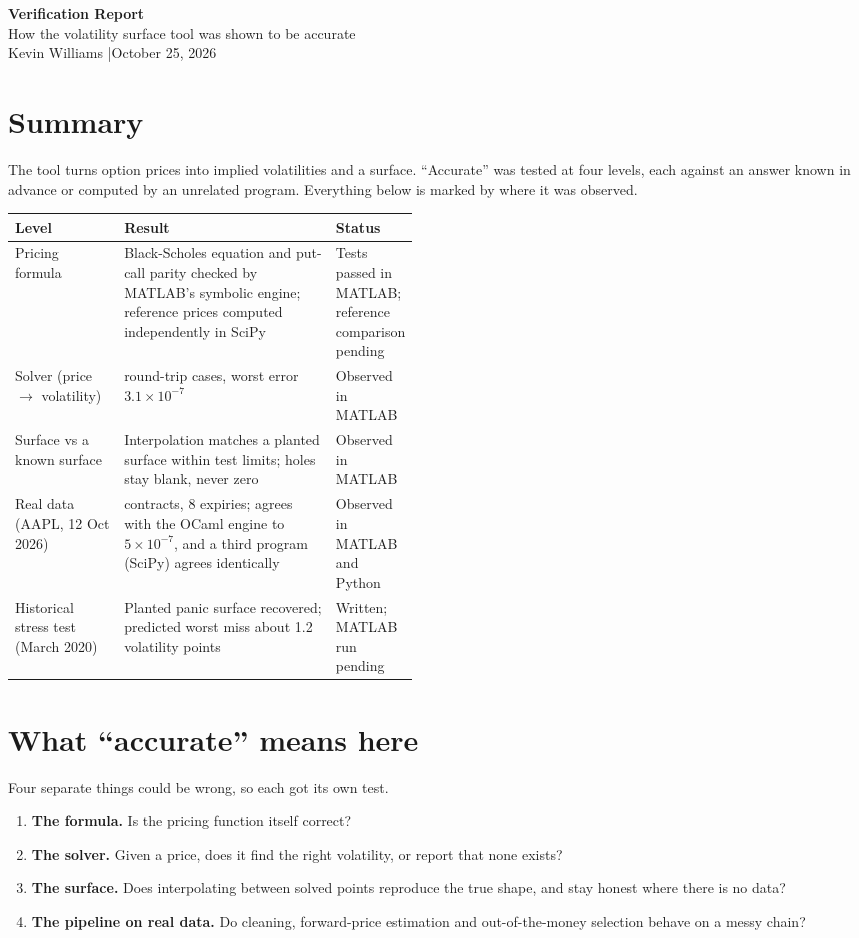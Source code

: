 \documentclass[11pt]{article}
\newcommand{\titleblock}[2]{\begin{center}{\LARGE\bfseries\color{accent}#1}\\[0.4em]{\large #2}\\[0.3em]{\small Kevin Williams \quad|\quad October 25, 2026}\end{center}\vspace{0.3em}}
\begin{document}
\titleblock{Verification Report}{How the volatility surface tool was shown to be accurate}

\section{Summary}
The tool turns option prices into implied volatilities and a surface. ``Accurate'' was tested at four levels, each against an answer known in advance or computed by an unrelated program. Everything below is marked by where it was observed.

\begin{tabularx}{\linewidth}{@{}>{\raggedright\arraybackslash}p{0.27\linewidth}>{\raggedright\arraybackslash}X>{\raggedright\arraybackslash}p{0.2\linewidth}@{}}
\toprule
\textbf{Level} & \textbf{Result} & \textbf{Status}\\\midrule
Pricing formula & Black-Scholes equation and put-call parity checked by MATLAB's symbolic engine; reference prices computed independently in SciPy & Tests passed in MATLAB; reference comparison pending\\
Solver (price $\to$ volatility) & 142 round-trip cases, worst error $3.1\times10^{-7}$ & Observed in MATLAB\\
Surface vs a known surface & Interpolation matches a planted surface within test limits; holes stay blank, never zero & Observed in MATLAB\\
Real data (AAPL, 12 Oct 2026) & 140 contracts, 8 expiries; agrees with the OCaml engine to $5\times10^{-7}$, and a third program (SciPy) agrees identically & Observed in MATLAB and Python\\
Historical stress test (March 2020) & Planted panic surface recovered; predicted worst miss about 1.2 volatility points & Written; MATLAB run pending\\\bottomrule
\end{tabularx}

\section{What ``accurate'' means here}
Four separate things could be wrong, so each got its own test.
\begin{enumerate}[leftmargin=1.5em]
\item \textbf{The formula.} Is the pricing function itself correct?
\item \textbf{The solver.} Given a price, does it find the right volatility, or report that none exists?
\item \textbf{The surface.} Does interpolating between solved points reproduce the true shape, and stay honest where there is no data?
\item \textbf{The pipeline on real data.} Do cleaning, forward-price estimation and out-of-the-money selection behave on a messy chain?
\end{enumerate}
\end{document}
